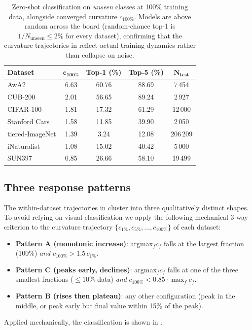 \documentclass{article}
\begin{document}
\begin{table}[t]
\centering
\caption{Zero-shot classification on \emph{unseen} classes at 100\% training data, alongside converged curvature $c_{100\%}$. Models are above random across the board (random-chance top-1 is $1/N_{\text{unseen}} \leq 2\%$ for every dataset), confirming that the curvature trajectories in  reflect actual training dynamics rather than collapse on noise.}
\label{tab:zsl_accuracy}
\begin{tabular}{lcccc}
\toprule
\textbf{Dataset} & $\boldsymbol{c_{100\%}}$ & \textbf{Top-1 (\%)} & \textbf{Top-5 (\%)} & $\boldsymbol{N_{\text{test}}}$ \\
\midrule
AwA2            & 6.63 & 60.76 & 88.69 & 7\,454 \\
CUB-200         & 2.01 & 56.65 & 89.24 & 2\,927 \\
CIFAR-100       & 1.81 & 17.32 & 61.29 & 12\,000 \\
Stanford Cars   & 1.58 & 11.85 & 39.90 & 2\,050 \\
tiered-ImageNet & 1.39 & \phantom{0}3.24 & 12.08 & 206\,209 \\
iNaturalist     & 1.08 & 15.02 & 40.42 & 5\,000 \\
SUN397          & 0.85 & 26.66 & 58.10 & 19\,499 \\
\bottomrule
\end{tabular}
\end{table}

\subsection{Three response patterns}\label{sec:patterns}

The within-dataset trajectories in  cluster into three qualitatively distinct shapes.
To avoid relying on visual classification we apply the following mechanical 3-way criterion to the curvature trajectory $\{c_{1\%}, c_{5\%}, \dots, c_{100\%}\}$ of each dataset:
\begin{itemize}
    \item \textbf{Pattern A (monotonic increase)}: argmax$_f c_f$ falls at the largest fraction (100\%) \emph{and} $c_{100\%} > 1.5\,c_{1\%}$.
    \item \textbf{Pattern C (peaks early, declines)}: argmax$_f c_f$ falls at one of the three smallest fractions ($\leq 10\%$ data) \emph{and} $c_{100\%} < 0.85 \cdot \max_f c_f$.
    \item \textbf{Pattern B (rises then plateau)}: any other configuration (peak in the middle, or peak early but final value within 15\% of the peak).
\end{itemize}
Applied mechanically, the classification is shown in .
\end{document}
